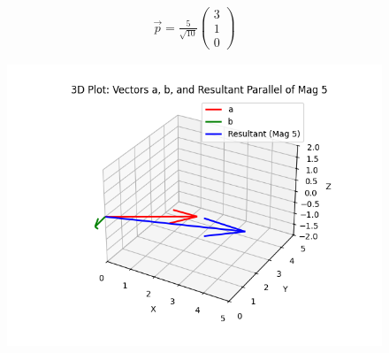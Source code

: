 \documentclass[journal]{IEEEtran}
\begin{document}
\begin{align}
\boxed{
\vec{p} = \frac{5}{\sqrt{10}}
\begin{pmatrix}
3 \\
1 \\
0
\end{pmatrix}
}
\end{align}




\begin{figure}[H]
\begin{center}
\includegraphics[width=0.75\columnwidth]{figs/graph.png}
\end{center}
\caption{}
\label{fig:Fig}
\end{figure}
\end{document}
